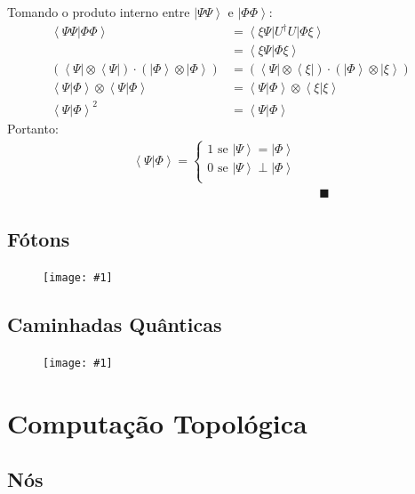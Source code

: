 \documentclass[t]{beamer}
\newcommand{\cqd}{\blacksquare}
\newcommand{\ket}[1]{\ensuremath{\left|#1\right\rangle}}
\newcommand{\bra}[1]{\ensuremath{\left\langle#1\right|}}
\newcommand{\braket}[2]{\ensuremath{\left\langle#1|#2\right\rangle}}
\newcommand{\imgw}[2]{%
\begin{center}
	\begin{figure}
	\texttt{[image: \#1]}\\
	\end{figure}
\end{center}
}
\begin{document}
	\begin{frame}{\subsecname}
		Tomando o produto interno entre $\ket{\Psi\Psi}$ e $\ket{\Phi\Phi}$:
		\begin{align*}
		\braket{\Psi\Psi}{\Phi\Phi} &= \bra{\xi\Psi}U^{\dagger} U \ket{\Phi\xi}\\
		&= \braket{\xi\Psi}{\Phi\xi}\\
		(\bra{\Psi} \otimes \bra{\Psi}) \cdot (\ket{\Phi} \otimes \ket{\Phi}) &= (\bra{\Psi} \otimes \bra{\xi}) \cdot (\ket{\Phi} \otimes \ket{\xi})\\
		\braket{\Psi}{\Phi} \otimes \braket{\Psi}{\Phi} &= \braket{\Psi}{\Phi} \otimes \braket{\xi}{\xi}\\
		\braket{\Psi}{\Phi}^2 &= \braket{\Psi}{\Phi}
		\end{align*}
		Portanto:
		\begin{align*}
			\braket{\Psi}{\Phi} = \begin{cases}
			1 \text{ se } \ket{\Psi} = \ket{\Phi}\\
			0 \text{ se } \ket{\Psi} \perp \ket{\Phi}\\
			\end{cases}\\
		&& \cqd
		\end{align*}
	\end{frame}
	
	\subsection{Fótons}	
	
	\begin{frame}{\subsecname}
		\imgw{superposition.pdf}{\textwidth}
	\end{frame}
	
	\subsection{Caminhadas Quânticas}
	
	\begin{frame}{\subsecname}
		\imgw{superposition.pdf}{\textwidth}
	\end{frame}

	\section{Computação Topológica}
	
	\subsection{Nós}
	
\end{document}
